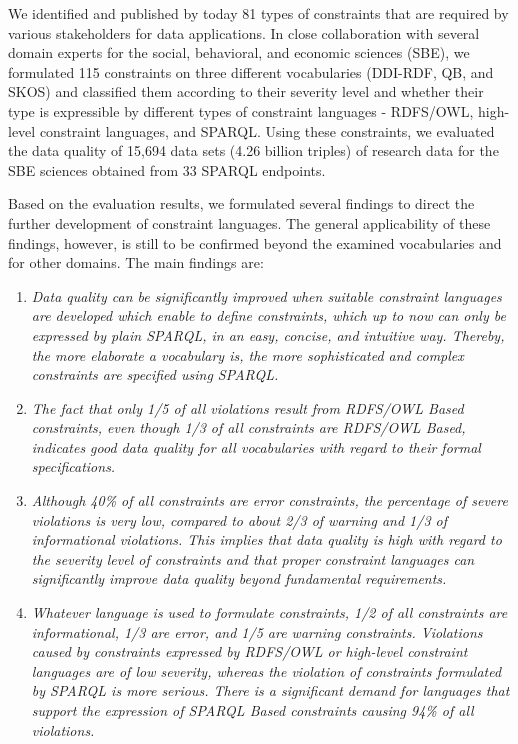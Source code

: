 \documentclass[conference]{IEEEtran}
\newcommand{\ke}[1]{\todo[size=\small, color=red!40]{\textbf{Kai:} #1}}
\begin{document}
We identified and published by today 81 types of constraints  that are required by various stakeholders for data applications.
In close collaboration with several domain experts for the social, behavioral, and economic sciences (SBE), we formulated 115 constraints on three different vocabularies (DDI-RDF, QB, and SKOS) and classified them according to their severity level and  whether their type is expressible by different types of constraint languages - RDFS/OWL, high-level constraint languages, and SPARQL. 
Using these constraints, we evaluated  the data quality of 15,694 data sets (4.26 billion triples) of research data for the SBE sciences obtained from 33 SPARQL endpoints.

Based on the evaluation results, we formulated several findings to direct the further development of constraint languages. The general applicability of these findings, however, is still to be confirmed beyond the examined vocabularies and for other domains.
The main findings are: 

\begin{enumerate}
\item
\emph{Data quality can be significantly improved when suitable constraint languages are developed which enable to define 
constraints, which up to now can only be expressed by plain SPARQL, in an easy, concise, and intuitive way. Thereby, the more elaborate a vocabulary is, the more sophisticated and complex constraints are specified using SPARQL.\ke{Nachsatz verstehe ich nicht...}}
\item
\emph{The fact that only 1/5 of all violations result from RDFS/OWL Based constraints, even though 1/3 of all constraints are RDFS/OWL Based, indicates good data quality for all vocabularies with regard to their formal specifications.}  
\item
\emph{Although 40\% of all constraints are error constraints, the percentage of severe violations is very low, compared to about 2/3 of warning and 1/3 of informational violations. This implies that data quality is high with regard to the severity level of constraints and that proper constraint languages can significantly improve data quality beyond fundamental requirements.}
\item
\emph{Whatever language is used to formulate constraints, 1/2 of all constraints are informational, 1/3 are error, and 1/5 are warning constraints. 
Violations caused by constraints expressed by RDFS/OWL or high-level constraint languages are of low severity, whereas the violation of constraints formulated by SPARQL is more serious.
There is a significant demand for languages that support the expression of SPARQL Based constraints causing 94\% of all violations.}
\end{enumerate}
\end{document}
